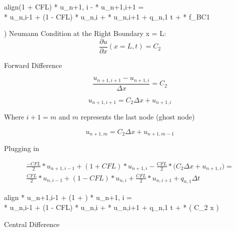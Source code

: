 \documentclass[10pt, letter, showtrims]{extarticle}
\newcommand{\boxedeq}[2]{\begin{empheq}[box={\fboxsep=6pt\fbox}]{align}\label{#1}#2\end{empheq}}
\begin{document}
		\boxedeq{}{(1 + CFL) * u_{n+1, i} -  * u_{n+1,i+1} = \\ \frac{CFL}{2} * u_{n,i-1} + (1 - CFL) * u_{n,i} + \frac{CFL}{2} * u_{n,i+1} + q_{n,1} \Delta t + \frac{CFL}{2} * f_{BC1}}    		
    		
		) Neumann Condition at the Right Boundary x = L: \\
		
		\begin{equation}
			\frac{\partial u}{\partial x}(x=L, t) = C_{2}
    		\end{equation}
    		
    		\noindent
    		Forward Difference
    		
    		\begin{equation}
    			\frac{u_{n+1,i+1} - u_{n+1,i}}{\Delta x} = C_{2}
    		\end{equation}
    		
    		\begin{equation}
    			u_{n+1,i+1} = C_{2} \Delta x + u_{n+1,i}
    		\end{equation}
    		
    		\noindent
    		Where $i+1 = m$ and $m$ represents the last node (ghost node)
    		
    		\begin{equation}
    			u_{n+1,m} = C_{2} \Delta x + u_{n+1,m-1}
    		\end{equation}
    		
    		\noindent
    		Plugging in

		\begin{equation}
			\begin{split}
			\frac{-CFL}{2} * u_{n+1,i-1} + (1 + CFL) * u_{n+1, i} - \frac{CFL}{2} * \big ( C_{2} \Delta x + u_{n+1,i} \big) = \\
			 \frac{CFL}{2} * u_{n,i-1} + (1 - CFL) * u_{n,i} + \frac{CFL}{2} * u_{n,i+1} + q_{n,1} \Delta t
			 \end{split}
		\end{equation} 
		
		\boxedeq{}{ * u_{n+1,i-1} + (1 + ) * u_{n+1, i} = \\
			 \frac{CFL}{2} * u_{n,i-1} + (1 - CFL) * u_{n,i} + \frac{CFL}{2} * u_{n,i+1} + q_{n,1} \Delta t + \frac{CFL}{2} * \big ( C_{2} \Delta x \big)}   		
    		
    		\pagebreak
    		
    		\noindent
    		Central Difference
    		
\end{document}
